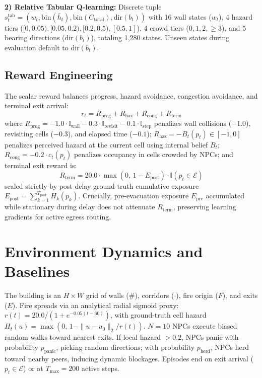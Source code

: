 \documentclass[10pt,twocolumn]{article}
\begin{document}
\textbf{2) Relative Tabular Q-learning:} Discrete tuple $s_t^{\mathrm{tab}} = (w_t, \mathrm{bin}(\bar{h}_t), \mathrm{bin}(C_{\mathrm{total}}), \mathrm{dir}(b_t))$ with 16 wall states ($w_t$), 4 hazard tiers ($[0, 0.05), [0.05, 0.2), [0.2, 0.5), [0.5, 1]$), 4 crowd tiers ($0, 1, 2, \ge 3$), and 5 bearing directions ($\mathrm{dir}(b_t)$), totaling 1,280 states. Unseen states during evaluation default to $\mathrm{dir}(b_t)$.

\subsection{Reward Engineering}
The scalar reward balances progress, hazard avoidance, congestion avoidance, and terminal exit arrival:
\begin{equation}
r_t = R_{\mathrm{prog}} + R_{\mathrm{haz}} + R_{\mathrm{cong}} + R_{\mathrm{term}}
\end{equation}
where $R_{\mathrm{prog}} = -1.0 \cdot \mathbb{I}_{\mathrm{wall}} - 0.3 \cdot \mathbb{I}_{\mathrm{revisit}} - 0.1 \cdot \mathbb{I}_{\mathrm{step}}$ penalizes wall collisions ($-1.0$), revisiting cells ($-0.3$), and elapsed time ($-0.1$); $R_{\mathrm{haz}} = -B_t(p_t) \in [-1, 0]$ penalizes perceived hazard at the current cell using internal belief $B_t$; $R_{\mathrm{cong}} = -0.2 \cdot c_t(p_t)$ penalizes occupancy in cells crowded by NPCs; and terminal exit reward is:
\begin{equation}
R_{\mathrm{term}} = 20.0 \cdot \max(0,\, 1 - E_{\mathrm{post}}) \cdot \mathbb{I}(p_t \in \mathcal{E})
\end{equation}
scaled strictly by post-delay ground-truth cumulative exposure $E_{\mathrm{post}} = \sum_{k=1}^{T_{\mathrm{post}}} H_k(p_k)$. Crucially, pre-evacuation exposure $E_{\mathrm{pre}}$ accumulated while stationary during delay does not attenuate $R_{\mathrm{term}}$, preserving learning gradients for active egress routing.

\section{Environment Dynamics and Baselines}
The building is an $H \times W$ grid of walls ($\#$), corridors ($\cdot$), fire origin ($F$), and exits ($E$). Fire spreads via an analytical radial sigmoid proxy: $r(t) = 20.0 / (1 + e^{-0.05(t - 60)})$, with ground-truth cell hazard $H_t(u) = \max(0,\, 1 - \|u - u_0\|_2 / r(t))$. $N = 10$ NPCs execute biased random walks toward nearest exits. If local hazard $>0.2$, NPCs panic with probability $p_{\mathrm{panic}}$, picking random directions; with probability $p_{\mathrm{herd}}$, NPCs herd toward nearby peers, inducing dynamic blockages. Episodes end on exit arrival ($p_t \in \mathcal{E}$) or at $T_{\mathrm{max}} = 200$ active steps.
\end{document}
